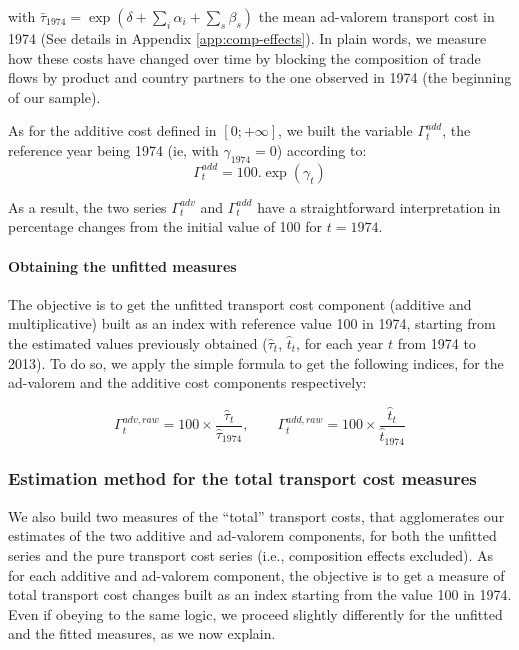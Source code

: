 \documentclass[a4paper,11pt]{article}
\begin{document}
\noindent with $\bar{\tau}_{1974} = \exp(\delta +\sum_i \alpha_i +\sum_s \beta_s)$ the mean ad-valorem transport cost in 1974 (See details in Appendix \ref{app:comp-effects}).
In plain words, we measure how these costs have changed over time by blocking the composition of trade flows by product and country partners to the one observed in 1974 (the beginning of our sample).

As for the additive cost defined in $[0;+\infty]$, we built the variable $\Gamma^{add}_t$, the reference year being 1974 (ie, with $\gamma_{1974}=0$) according to:
\begin{equation}
\Gamma^{add}_t = 100.\exp(\gamma_t) \label{eq:comp_effects_add}
\end{equation}

\noindent As a result, the two series $\Gamma^{adv}_t$ and $\Gamma^{add}_t$ have a straightforward interpretation in percentage changes from the initial value of 100 for $t=1974$.


\paragraph{Obtaining the unfitted measures} The objective is to get the unfitted transport cost component (additive and multiplicative) built as an index with reference value 100 in 1974, starting from the estimated values previously obtained ($\widehat{\tau}_t$, $\widehat{t}_t$, for each year $t$ from 1974 to 2013).
To do so, we apply the simple formula to get the following indices, for the ad-valorem and the additive cost components respectively:

$$\Gamma^{adv, raw}_t = 100\times\frac{\widehat{\tau}_t}{\widehat{\tau}_{1974}},\qquad \Gamma^{add, raw}_t = 100\times\frac{\widehat{t}_t}{\widehat{t}_{1974}}$$



\subsubsection{Estimation method for the total transport cost measures}

We also build two measures of the ``total'' transport costs, that agglomerates our estimates of the two additive and ad-valorem components, for both the unfitted series and the pure transport cost series (i.e., composition effects excluded).
As for each additive and ad-valorem component, the objective is to get a measure of total transport cost changes built as an index starting from the value 100 in 1974.
Even if obeying to the same logic, we proceed slightly differently for the unfitted and the fitted measures, as we now explain.
\smallskip
\end{document}
